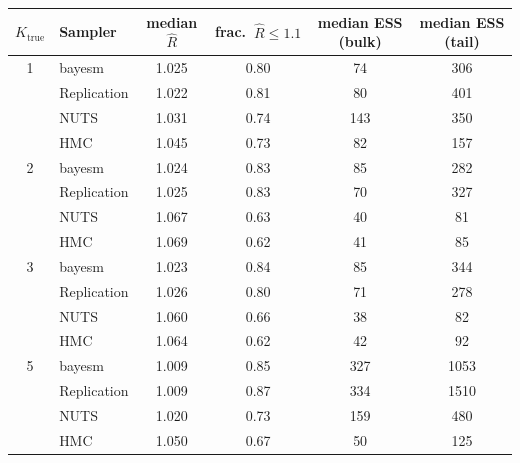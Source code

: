 \begin{tabular}{clcccc}
\toprule
$K_{\text{true}}$ & Sampler & median $\widehat{R}$ & frac.\ $\widehat{R}\leq1.1$ & median ESS (bulk) & median ESS (tail) \\
\midrule
1 & bayesm & 1.025 & 0.80 & 74 & 306 \\
 & Replication & 1.022 & 0.81 & 80 & 401 \\
 & NUTS & 1.031 & 0.74 & 143 & 350 \\
 & HMC & 1.045 & 0.73 & 82 & 157 \\
2 & bayesm & 1.024 & 0.83 & 85 & 282 \\
 & Replication & 1.025 & 0.83 & 70 & 327 \\
 & NUTS & 1.067 & 0.63 & 40 & 81 \\
 & HMC & 1.069 & 0.62 & 41 & 85 \\
3 & bayesm & 1.023 & 0.84 & 85 & 344 \\
 & Replication & 1.026 & 0.80 & 71 & 278 \\
 & NUTS & 1.060 & 0.66 & 38 & 82 \\
 & HMC & 1.064 & 0.62 & 42 & 92 \\
5 & bayesm & 1.009 & 0.85 & 327 & 1053 \\
 & Replication & 1.009 & 0.87 & 334 & 1510 \\
 & NUTS & 1.020 & 0.73 & 159 & 480 \\
 & HMC & 1.050 & 0.67 & 50 & 125 \\
\bottomrule
\end{tabular}
